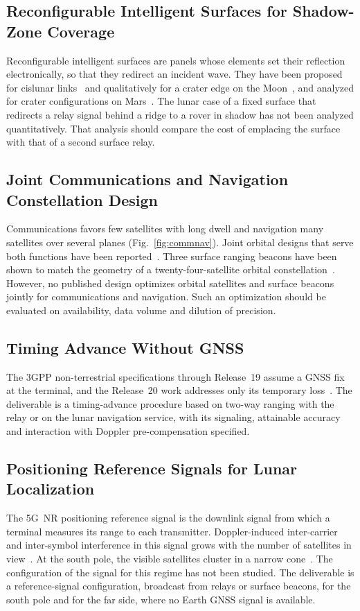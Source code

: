 \documentclass{IEEEoj}
\begin{document}
\subsection{Reconfigurable Intelligent Surfaces for Shadow-Zone Coverage}
Reconfigurable intelligent surfaces are panels whose elements set their reflection electronically, so that they redirect an incident wave. They have been proposed for cislunar links~\cite{ris_cislunar2024} and qualitatively for a crater edge on the Moon~\cite{liyanaarachchi_cislunar}, and analyzed for crater configurations on Mars~\cite{koktas_ris_mars}. The lunar case of a fixed surface that redirects a relay signal behind a ridge to a rover in shadow has not been analyzed quantitatively. That analysis should compare the cost of emplacing the surface with that of a second surface relay.

\subsection{Joint Communications and Navigation Constellation Design}
Communications favors few satellites with long dwell and navigation many satellites over several planes (Fig.~\ref{fig:commnav}). Joint orbital designs that serve both functions have been reported~\cite{bhamidipati_constellation_2023}. Three surface ranging beacons have been shown to match the geometry of a twenty-four-satellite orbital constellation~\cite{baweja_dop}. However, no published design optimizes orbital satellites and surface beacons jointly for communications and navigation. Such an optimization should be evaluated on availability, data volume and dilution of precision.

\subsection{Timing Advance Without GNSS}
The 3GPP non-terrestrial specifications through Release~19 assume a GNSS fix at the terminal, and the Release~20 work addresses only its temporary loss~\cite{3gpp_rp261568}. The deliverable is a timing-advance procedure based on two-way ranging with the relay or on the lunar navigation service, with its signaling, attainable accuracy and interaction with Doppler pre-compensation specified.

\subsection{Positioning Reference Signals for Lunar Localization}
The 5G~NR positioning reference signal is the downlink signal from which a terminal measures its range to each transmitter. Doppler-induced inter-carrier and inter-symbol interference in this signal grows with the number of satellites in view~\cite{prs_ntn_plans2023}. At the south pole, the visible satellites cluster in a narrow cone~\cite{baweja_dop}. The configuration of the signal for this regime has not been studied. The deliverable is a reference-signal configuration, broadcast from relays or surface beacons, for the south pole and for the far side, where no Earth GNSS signal is available.
\end{document}
